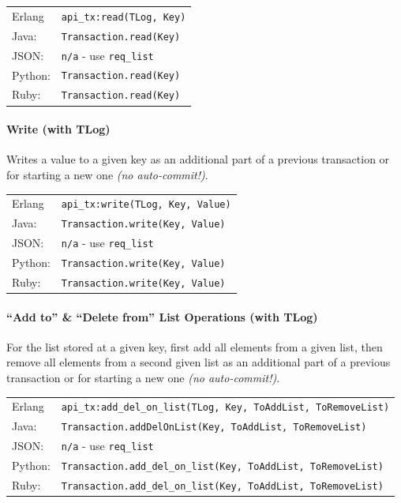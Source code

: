 \documentclass[a4paper]{scrreprt}
\newcommand{\code}[1]{\lstinline[basicstyle=\ttfamily]!#1!}
\begin{document}
\begin{tabular}{lp{14cm}}
Erlang  & \code{api_tx:read(TLog, Key)}\\
Java:   & \code{Transaction.read(Key)}\\
JSON:   & \code{n/a} - use \code{req_list}\\
Python: & \code{Transaction.read(Key)}\\
Ruby:   & \code{Transaction.read(Key)}
\end{tabular}

\paragraph{Write (with TLog)}
Writes a value to a given key as an additional part
of a previous transaction or for starting a new one \emph{(no auto-commit!)}.

\begin{tabular}{lp{14cm}}
Erlang  & \code{api_tx:write(TLog, Key, Value)}\\
Java:   & \code{Transaction.write(Key, Value)}\\
JSON:   & \code{n/a} - use \code{req_list}\\
Python: & \code{Transaction.write(Key, Value)}\\
Ruby:   & \code{Transaction.write(Key, Value)}
\end{tabular}

\paragraph{``Add to'' \& ``Delete from'' List Operations (with TLog)}
For the list stored at a given key, first add all elements from a given list,
then remove all elements from a second given list as an additional part
of a previous transaction or for starting a new one \emph{(no auto-commit!)}.

\begin{tabular}{lp{14cm}}
Erlang  & \code{api_tx:add_del_on_list(TLog, Key, ToAddList, ToRemoveList)}\\
Java:   & \code{Transaction.addDelOnList(Key, ToAddList, ToRemoveList)}\\
JSON:   & \code{n/a} - use \code{req_list}\\
Python: & \code{Transaction.add_del_on_list(Key, ToAddList, ToRemoveList)}\\
Ruby:   & \code{Transaction.add_del_on_list(Key, ToAddList, ToRemoveList)}
\end{tabular}
\end{document}
